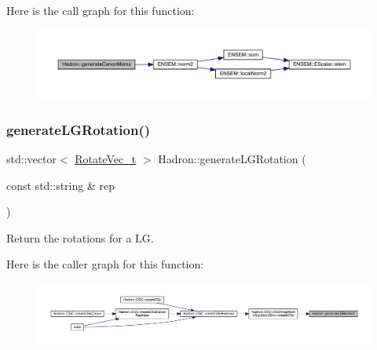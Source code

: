 Here is the call graph for this function\+:\nopagebreak
\begin{figure}[H]
\begin{center}
\leavevmode
\includegraphics[width=350pt]{d1/daf/namespaceHadron_af42e0a1c54e10b67abac83c56c67b40e_cgraph}
\end{center}
\end{figure}
\mbox{\label{namespaceHadron_a4467e73143184e2935f0f0f0e31079bc}} 
\subsubsection{\texorpdfstring{generateLGRotation()}{generateLGRotation()}}
{\footnotesize\ttfamily std\+::vector$<$ \mbox{\hyperlink{structHadron_1_1RotateVec__t}{Rotate\+Vec\+\_\+t}} $>$ Hadron\+::generate\+L\+G\+Rotation (\begin{DoxyParamCaption}\item[{const std\+::string \&}]{rep }\end{DoxyParamCaption})}



Return the rotations for a LG. 

Here is the caller graph for this function\+:\nopagebreak
\begin{figure}[H]
\begin{center}
\leavevmode
\includegraphics[width=350pt]{d1/daf/namespaceHadron_a4467e73143184e2935f0f0f0e31079bc_icgraph}
\end{center}
\end{figure}
\mbox{\label{namespaceHadron_a511bab858a88c02ec88a697fd5430e0d}} 
